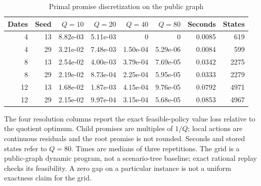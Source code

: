\begin{table}[htbp]
\centering\small
\caption{Primal promise discretization on the public graph}\label{tab:grid}
\begin{tabular}{rrrrrrrr}
\toprule
Dates & Seed & $Q=10$ & $Q=20$ & $Q=40$ & $Q=80$ & Seconds & States \\
\midrule
4 & 13 & 8.82e-03 & 5.11e-03 & 0 & 0 & 0.0085 & 619 \\
4 & 29 & 3.21e-02 & 7.48e-03 & 1.50e-04 & 5.29e-06 & 0.0084 & 599 \\
8 & 13 & 2.54e-02 & 4.00e-03 & 3.79e-04 & 7.69e-05 & 0.0342 & 2275 \\
8 & 29 & 2.19e-02 & 8.73e-04 & 2.25e-04 & 5.95e-05 & 0.0333 & 2279 \\
12 & 13 & 1.68e-02 & 1.87e-03 & 4.15e-04 & 9.76e-05 & 0.0792 & 4971 \\
12 & 29 & 2.15e-02 & 9.97e-04 & 3.15e-04 & 5.68e-05 & 0.0853 & 4967 \\
\bottomrule
\end{tabular}
\par\smallskip\begin{minipage}{\textwidth}\footnotesize The four resolution columns report the exact feasible-policy value loss relative to the quotient optimum. Child promises are multiples of $1/Q$; local actions are continuous residuals and the root promise is not rounded. Seconds and stored states refer to $Q=80$. Times are medians of three repetitions. The grid is a public-graph dynamic program, not a scenario-tree baseline; exact rational replay checks its feasibility. A zero gap on a particular instance is not a uniform exactness claim for the grid.\end{minipage}
\end{table}
\clearpage
